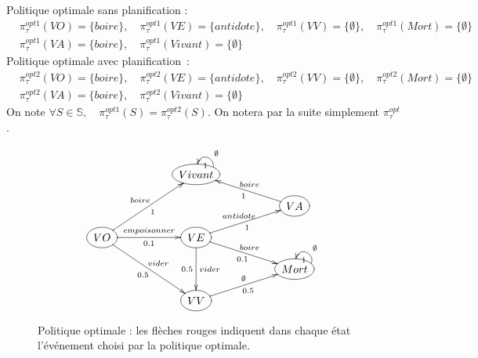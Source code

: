 Politique optimale sans planification :
\begin{align*}
    & \pi^{opt1}_\tau(VO)=\{boire\}, \quad \pi^{opt1}_\tau(VE)=\{antidote\}, \quad \pi^{opt1}_\tau(VV)=\{\emptyset\}, \quad \pi^{opt1}_\tau(Mort)=\{\emptyset\} \\
    & \pi^{opt1}_\tau(VA)=\{boire\}, \quad \pi^{opt1}_\tau(Vivant)=\{\emptyset\} \quad
\end{align*}
Politique optimale avec planification :
\begin{align}
    & \pi^{opt2}_\tau(VO)=\{boire\}, \quad \pi^{opt2}_\tau(VE)=\{antidote\}, \quad \pi^{opt2}_\tau(VV)=\{\emptyset\}, \quad \pi^{opt2}_\tau(Mort)=\{\emptyset\} \\
    & \pi^{opt2}_\tau(VA)=\{boire\}, \quad \pi^{opt2}_\tau(Vivant)=\{\emptyset\} \quad
\end{align}
On note $\forall S\in \mathds{S},\quad \pi^{opt1}_\tau(S) =\pi^{opt2}_\tau(S)$. On notera par la suite simplement $\pi^{opt}_\tau$.
\begin{figure}[h!]
    \centering
    \[
        \xymatrix@R=1em@C=5em{
            &    *++[o][F-]{Vivant} \ar@[BrickRed]  @(r,u) []_{\emptyset}^1& \\
            &   &    *++[o][F-]{VA} \ar@[BrickRed]  [lu]_{boire}^1  \\
            *++[o][F-]{VO}  \ar @[BrickRed] [ruu]^{boire}_1 \ar [r]^{empoisonner}_{0.1} \ar[rdd]^{vider}_{0.5} &*++[o][F-]{VE} \ar@[BrickRed] [ru]^{antidote}_1 \ar[rd]^{boire}_{0.1} \ar[dd]^{vider}_{0.5}&  \\
            &    & *++[o][F-]{Mort} \ar@[BrickRed]  @(r,u) []_{\emptyset}^1 \\
             &     *++[o][F-]{VV} \ar@[BrickRed] [ru]^{\emptyset}_{0.5} &  \\
        }    
    \]
    \captionsetup{width=0.8\textwidth}
    \caption{Politique optimale : les flèches rouges indiquent dans chaque état l'événement choisi par la politique optimale.}
    \label{fig:placeholder}
\end{figure}



